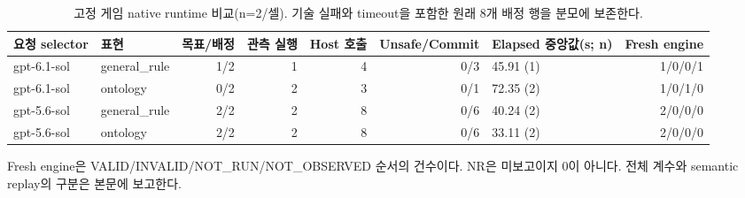 \begin{table}[t]
\caption{고정 게임 native runtime 비교(n=2/셀). 기술 실패와 timeout을 포함한 원래 8개 배정 행을 분모에 보존한다.}
\label{tab:runtime-comparison-aggregate}
\centering\footnotesize
\setlength{\tabcolsep}{4pt}
\renewcommand{\arraystretch}{1.20}
\begin{tabularx}{\textwidth}{@{}l l r r r r l r@{}}
\toprule
요청 selector & 표현 & 목표/배정 & 관측 실행 & Host 호출 & Unsafe/Commit & Elapsed 중앙값(s; n) & Fresh engine \\
\midrule
gpt-6.1-sol & general\_rule & 1/2 & 1 & 4 & 0/3 & 45.91 (1) & 1/0/0/1 \\
gpt-6.1-sol & ontology & 0/2 & 2 & 3 & 0/1 & 72.35 (2) & 1/0/1/0 \\
gpt-5.6-sol & general\_rule & 2/2 & 2 & 8 & 0/6 & 40.24 (2) & 2/0/0/0 \\
gpt-5.6-sol & ontology & 2/2 & 2 & 8 & 0/6 & 33.11 (2) & 2/0/0/0 \\
\bottomrule
\end{tabularx}
\par\vspace{3pt}\noindent\parbox{0.98\textwidth}{\footnotesize Fresh engine은 VALID/INVALID/NOT\_RUN/NOT\_OBSERVED 순서의 건수이다. NR은 미보고이지 0이 아니다. 전체 계수와 semantic replay의 구분은 본문에 보고한다.}
\end{table}
